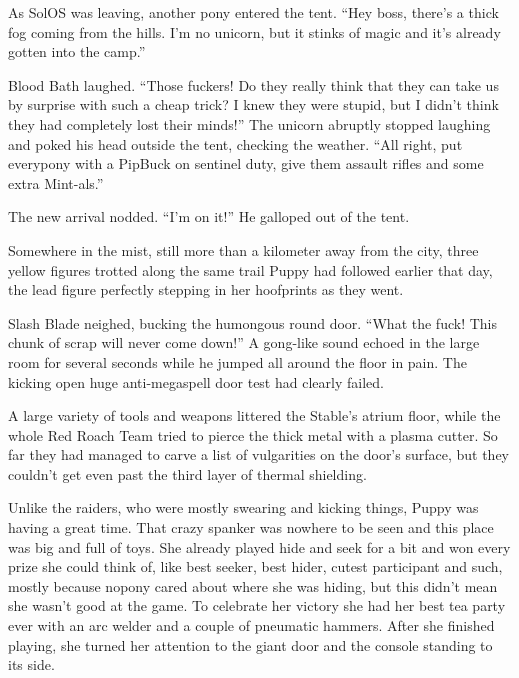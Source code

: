 As SolOS was leaving, another pony entered the tent. ``Hey boss, there's a thick fog coming from the hills. I'm no unicorn, but it stinks of magic and it's already gotten into the camp.''

Blood Bath laughed. ``Those fuckers! Do they really think that they can take us by surprise with such a cheap trick? I knew they were stupid, but I didn't think they had completely lost their minds!'' The unicorn abruptly stopped laughing and poked his head outside the tent, checking the weather. ``All right, put everypony with a PipBuck on sentinel duty, give them assault rifles and some extra Mint-als.''

The new arrival nodded. ``I'm on it!'' He galloped out of the tent.

Somewhere in the mist, still more than a kilometer away from the city, three yellow figures trotted along the same trail Puppy had followed earlier that day, the lead figure perfectly stepping in her hoofprints as they went.



\horizonline


Slash Blade neighed, bucking the humongous round door. ``What the fuck! This chunk of scrap will never come down!'' A gong-like sound echoed in the large room for several seconds while he jumped all around the floor in pain. The kicking open huge anti-megaspell door test had clearly failed.

A large variety of tools and weapons littered the Stable's atrium floor, while the whole Red Roach Team tried to pierce the thick metal with a plasma cutter. So far they had managed to carve a list of vulgarities on the door's surface, but they couldn't get even past the third layer of thermal shielding.

Unlike the raiders, who were mostly swearing and kicking things, Puppy was having a great time. That crazy spanker was nowhere to be seen and this place was big and full of toys. She already played hide and seek for a bit and won every prize she could think of, like best seeker, best hider, cutest participant and such, mostly because nopony cared about where she was hiding, but this didn't mean she wasn't good at the game. To celebrate her victory she had her best tea party ever with an arc welder and a couple of pneumatic hammers. After she finished playing, she turned her attention to the giant door and the console standing to its side.

